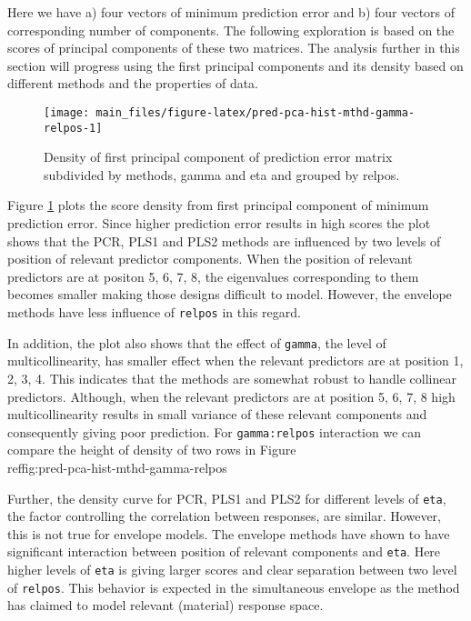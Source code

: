 \documentclass[12pt,3p,authoryear]{elsarticle}
\begin{document}
Here we have a) four vectors of minimum prediction error and b) four
vectors of corresponding number of components. The following exploration
is based on the scores of principal components of these two matrices.
The analysis further in this section will progress using the first
principal components and its density based on different methods and the
properties of data.







\begin{figure}[!htb]
\texttt{[image: main\_files/figure-latex/pred-pca-hist-mthd-gamma-relpos-1]} \caption{Density of first principal component of prediction error
matrix subdivided by methods, gamma and eta and grouped by relpos.}\label{fig:pred-pca-hist-mthd-gamma-relpos}
\end{figure}

Figure \ref{fig:pred-pca-hist-mthd-gamma-relpos} plots the score density
from first principal component of minimum prediction error. Since higher
prediction error results in high scores the plot shows that the PCR,
PLS1 and PLS2 methods are influenced by two levels of position of
relevant predictor components. When the position of relevant predictors
are at positon 5, 6, 7, 8, the eigenvalues corresponding to them becomes
smaller making those designs difficult to model. However, the envelope
methods have less influence of \texttt{relpos} in this regard.

In addition, the plot also shows that the effect of \texttt{gamma}, the
level of multicollinearity, has smaller effect when the relevant
predictors are at position 1, 2, 3, 4. This indicates that the methods
are somewhat robust to handle collinear predictors. Although, when the
relevant predictors are at position 5, 6, 7, 8 high multicollinearity
results in small variance of these relevant components and consequently
giving poor prediction.
\alert{For \texttt{gamma:relpos} interaction we can compare the height of density of two rows in Figure \\ref{fig:pred-pca-hist-mthd-gamma-relpos}}

Further, the density curve for PCR, PLS1 and PLS2 for different levels
of \texttt{eta}, the factor controlling the correlation between
responses, are similar. However, this is not true for envelope models.
The envelope methods have shown to have significant interaction between
position of relevant components and \texttt{eta}. Here higher levels of
\texttt{eta} is giving larger scores and clear separation between two
level of \texttt{relpos}. This behavior is expected in the simultaneous
envelope as the method has claimed to model relevant (material) response
space.
\end{document}
